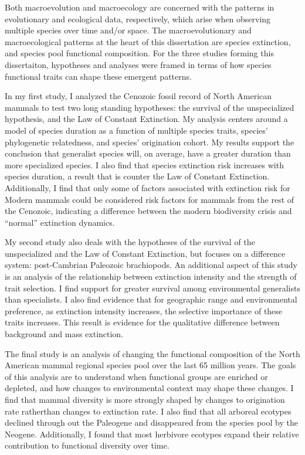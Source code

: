 \documentclass[12pt,letterpaper]{article}
\begin{document}
Both macroevolution and macroecology are concerned with the patterns in evolutionary and ecological data, respectively, which arise when observing multiple species over time and/or space. The macroevolutionary and macroecological patterns at the heart of this dissertation are species extinction, and species pool functional composition. For the three studies forming this dissertaiton, hypotheses and analyses were framed in terms of how species functional traits can shape these emergent patterns. 

In my first study, I analyzed the Cenozoic fossil record of North American mammals to test two long standing hypotheses: the survival of the unspecialized hypothesis, and the Law of Constant Extinction. My analysis centers around a model of species duration as a function of multiple species traits, species' phylogenetic relatedness, and species' origination cohort. My results support the conclusion that generalist species will, on average, have a greater duration than more specialized species. I also find that species extinction risk increases with species duration, a result that is counter the Law of Constant Extinction. Additionally, I find that only some of factors associated with extinction risk for Modern mammals could be considered risk factors for mammals from the rest of the Cenozoic, indicating a difference between the modern biodiversity crisis and ``normal'' extinction dynamics.

My second study also deals with the hypotheses of the survival of the unspecialized and the Law of Constant Extinction, but focuses on a difference system: post-Cambrian Paleozoic brachiopods. An additional aspect of this study is an analysis of the relationship between extinction intensity and the strength of trait selection. I find support for greater survival among environmental generalists than specialists. I also find evidence that for geographic range and environmental preference, as extinction intensity increases, the selective importance of these traits increases. This result is evidence for the qualitative difference between background and mass extinction.

The final study is an analysis of changing the functional composition of the North American mammal regional species pool over the last 65 million years. The goals of this analysis are to understand when functional groups are enriched or depleted, and how changes to environmental context may shape these changes. I find that mammal diversity is more strongly shaped by changes to origination rate ratherthan changes to extinction rate. I also find that all arboreal ecotypes declined through out the Paleogene and disappeared from the species pool by the Neogene. Additionally, I found that most herbivore ecotypes expand their relative contribution to functional diversity over time.
\end{document}
